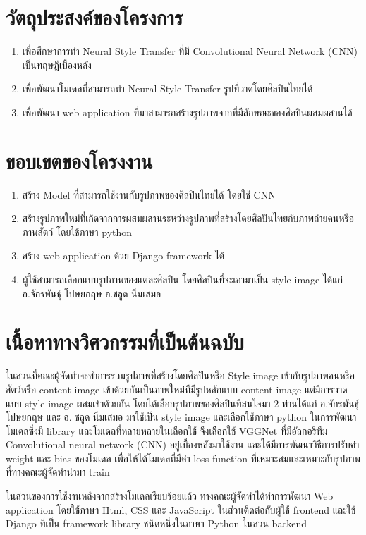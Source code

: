 \documentclass[12pt,oneside,openright,a4paper]{cpe-thai-project}
\begin{document}
\newpage

\section{วัตถุประสงค์ของโครงการ}
\begin{enumerate}
  \item	เพื่อศึกษาการทำ Neural Style Transfer ที่มี Convolutional Neural Network (CNN) เป็นทฤษฎีเบื้องหลัง
  \item เพื่อพัฒนาโมเดลที่สามารถทำ Neural Style Transfer รูปที่วาดโดยศิลปินไทยได้
  \item เพื่อพัฒนา web application ที่มาสามารถสร้างรูปภาพจากที่มีลักษณะของศิลปินผสมผสานได้
\end{enumerate}


\section{ขอบเขตของโครงงาน}
\begin{enumerate}
\item  สร้าง Model ที่สามารถใช้งานกับรูปภาพของศิลปินไทยได้ โดยใช้ CNN 
\item  สร้างรูปภาพใหม่ที่เกิดจากการผสมผสานระหว่างรูปภาพที่สร้างโดยศิลปินไทยกับภาพถ่ายคนหรือภาพสัตว์ โดยใช้ภาษา python
\item  สร้าง web application ด้วย Django framework ได้ 
\item ผู้ใช้สามารถเลือกแบบรูปภาพของแต่ละศิลปิน โดยศิลปินที่จะเอามาเป็น style image ได้แก่ 
\subitem อ.จักรพันธุ์ โปษยกฤษ
\subitem อ.ชลูด นิ่มเสมอ
\end{enumerate}


\section{เนื้อหาทางวิศวกรรมที่เป็นต้นฉบับ}
\par\setlength{\parindent}{5ex}ในส่วนที่คณะผู้จัดทำจะทำการรวมรูปภาพที่สร้างโดยศิลปินหรือ Style image เข้ากับรูปภาพคนหรือสัตว์หรือ content image เข้าด้วยกันเป็นภาพใหม่ทีมีรูปหลักแบบ content image แต่มีการวาดแบบ style image ผสมเข้าด้วยกัน โดยได้เลือกรูปภาพของศิลปินที่สนใจมา 2 ท่านได้แก่ อ.จักรพันธุ์ โปษยกฤษ และ อ. ชลูด นิ่มเสมอ มาใช้เป็น style image และเลือกใช้ภาษา python ในการพัฒนาโมเดลซึ่งมี library และโมเดลที่หลายหลายในเลือกใช้ จึงเลือกใช้ VGGNet ที่มีอัลกอริทึม Convolutional neural network (CNN) อยู่เบื้องหลังมาใช้งาน และได้มีการพัฒนาวิธีการปรับค่า weight และ bias ของโมเดล เพื่อให้ได้โมเดลที่มีค่า loss function ที่เหมาะสมและเหมาะกับรูปภาพที่ทางคณะผู้จัดทำนำมา train 
\par\setlength{\parindent}{5ex}ในส่วนของการใช้งานหลังจากสร้างโมเดลเรียบร้อยแล้ว ทางคณะผู้จัดทำได้ทำการพัฒนา Web application โดยใช้ภาษา Html, CSS และ JavaScript ในส่วนติดต่อกับผู้ใช้ frontend และใช้ Django  ที่เป็น framework library ชนิดหนึ่งในภาษา Python ในส่วน backend
\end{document}
